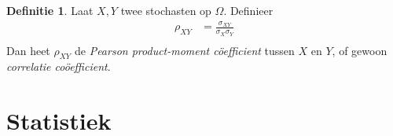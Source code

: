 \documentclass[a4paper]{book}
\theoremstyle{definition}
\newtheorem{definition}[theorem]{Definitie}
\begin{document}
\begin{definition}
    Laat $X,Y$ twee stochasten op $\Omega$.
    Definieer
    \begin{align*}
        \rho_{XY} &= \frac{\sigma_{XY}}{\sigma_X \sigma_Y} \\
    \end{align*}
    Dan heet $\rho_{XY}$ de \emph{Pearson product-moment c\"oefficient} tussen $X$ en $Y$, of gewoon \emph{correlatie co\"oefficient}.
\end{definition}

\chapter{Statistiek}
\end{document}
